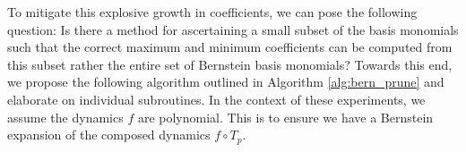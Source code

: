 To mitigate this explosive growth in coefficients, we can pose the following question: Is there a method for ascertaining a small subset of the basis monomials such that the correct maximum and minimum coefficients can be computed from this subset rather the entire set of Bernstein basis monomials?
%
Towards this end, we propose the following algorithm outlined in Algorithm \ref{alg:bern_prune} and elaborate on individual subroutines. In the context of these experiments, we assume the dynamics $f$ are polynomial. This is to ensure we have a Bernstein expansion of the composed dynamics $f \circ T_p$.



\newcommand\litem[1]{\item{\bfseries #1 \\}}

